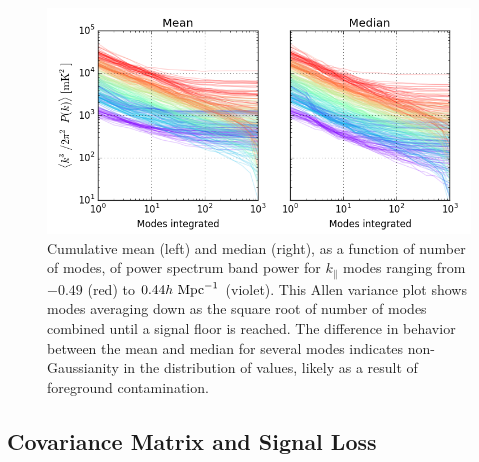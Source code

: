 \documentclass[twocolumn,numberedappendix]{emulateapj} \shorttitle{PSA64}
\newcommand{\hMpci}{h\ {\rm Mpc}^{-1}}
\begin{document}
\begin{figure}\centering
\includegraphics[width=1.8\columnwidth]{plots/pspec_variance.png}
\caption{
Cumulative mean (left) and median (right), as a function of number of modes,
of power spectrum band power for
$k_\parallel$ modes ranging from $-0.49$ (red) to $0.44\hMpci$ (violet).
This Allen variance plot shows modes averaging down as the square root of
number of modes combined until a signal floor is reached.  The difference in
behavior between the mean and median for several modes indicates non-Gaussianity
in the distribution of values, likely as a result of foreground contamination.
}\label{fig:pspec_variance}
\end{figure}


\subsection{Covariance Matrix and Signal Loss}
\label{sec:sigloss}
%
\end{document}
